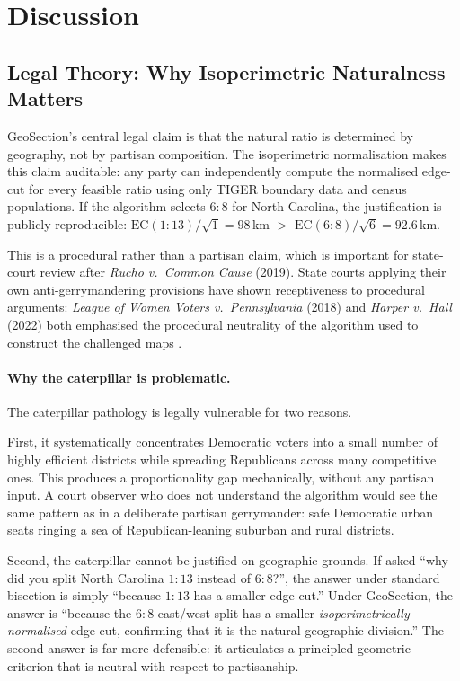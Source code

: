 \section{Discussion}
\label{sec:discussion}

\subsection{Legal Theory: Why Isoperimetric Naturalness Matters}

GeoSection's central legal claim is that the natural ratio is determined by
geography, not by partisan composition.
The isoperimetric normalisation makes this claim auditable: any party can
independently compute the normalised edge-cut for every feasible ratio using
only TIGER boundary data and census populations.
If the algorithm selects $6:8$ for North Carolina, the justification is
publicly reproducible: $\mathrm{EC}(1:13)/\sqrt{1} = 98$\,km $>$ $\mathrm{EC}(6:8)/\sqrt{6} = 92.6$\,km.

This is a procedural rather than a partisan claim, which is important for
state-court review after \emph{Rucho v.\ Common Cause} (2019).
State courts applying their own anti-gerrymandering provisions have shown
receptiveness to procedural arguments: \emph{League of Women Voters v.\
Pennsylvania} (2018) and \emph{Harper v.\ Hall} (2022) both emphasised
the procedural neutrality of the algorithm used to construct the challenged
maps \citep{lwv2018pa,harper2022nc}.

\paragraph{Why the caterpillar is problematic.}
The caterpillar pathology is legally vulnerable for two reasons.

First, it systematically concentrates Democratic voters into a small number
of highly efficient districts while spreading Republicans across many
competitive ones.
This produces a proportionality gap mechanically, without any partisan input.
A court observer who does not understand the algorithm would see the same
pattern as in a deliberate partisan gerrymander: safe Democratic urban seats
ringing a sea of Republican-leaning suburban and rural districts.

Second, the caterpillar cannot be justified on geographic grounds.
If asked ``why did you split North Carolina $1:13$ instead of $6:8$?'',
the answer under standard bisection is simply ``because $1:13$ has a smaller
edge-cut.''
Under GeoSection, the answer is ``because the $6:8$ east/west split has a
smaller \emph{isoperimetrically normalised} edge-cut, confirming that it is
the natural geographic division.''
The second answer is far more defensible: it articulates a principled
geometric criterion that is neutral with respect to partisanship.

